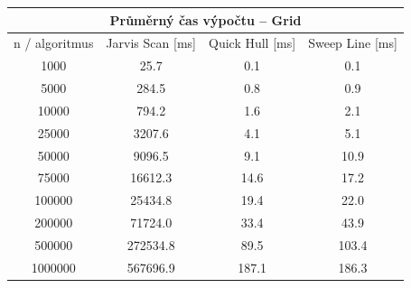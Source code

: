 \documentclass[a4paper, 12pt]{article}
\begin{document}
\begin{table}[]                                                                            
\centering                                                                                 
\begin{tabular}{|c|c|c|c|}                                                                 
\hline                                                                                     
\multicolumn{4}{|c|}{\textbf{Průměrný čas výpočtu – Grid}}                        \\ \hline
n / algoritmus & Jarvis Scan {[}ms{]} & Quick Hull {[}ms{]} & Sweep Line {[}ms{]} \\ \hline
1000           & 25.7                 & 0.1                 & 0.1                 \\ \hline
5000           & 284.5                & 0.8                 & 0.9                 \\ \hline
10000          & 794.2                & 1.6                 & 2.1                 \\ \hline
25000          & 3207.6               & 4.1                 & 5.1                 \\ \hline
50000          & 9096.5               & 9.1                 & 10.9                \\ \hline
75000          & 16612.3              & 14.6                & 17.2                \\ \hline
100000         & 25434.8              & 19.4                & 22.0                \\ \hline
200000         & 71724.0              & 33.4                & 43.9                \\ \hline
500000         & 272534.8             & 89.5                & 103.4               \\ \hline
1000000        & 567696.9             & 187.1               & 186.3               \\ \hline
\end{tabular}                                                                              
\end{table}                                                                                
                                                                                           
\end{document}
